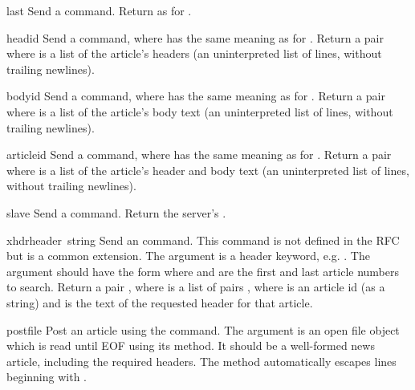 \begin{funcdesc}{last}{}
Send a  command.  Return as for .
\end{funcdesc}

\begin{funcdesc}{head}{id}
Send a  command, where  has the same meaning as for
.  Return a pair 
where  is a list of the article's headers (an uninterpreted
list of lines, without trailing newlines).
\end{funcdesc}

\begin{funcdesc}{body}{id}
Send a  command, where  has the same meaning as for
.  Return a pair 
where  is a list of the article's body text (an
uninterpreted list of lines, without trailing newlines).
\end{funcdesc}

\begin{funcdesc}{article}{id}
Send a  command, where  has the same meaning as
for .  Return a pair 
where  is a list of the article's header and body text (an
uninterpreted list of lines, without trailing newlines).
\end{funcdesc}

\begin{funcdesc}{slave}{}
Send a  command.  Return the server's .
\end{funcdesc}

\begin{funcdesc}{xhdr}{header\, string}
Send an  command.  This command is not defined in the RFC
but is a common extension.  The  argument is a header
keyword, e.g. .  The  argument should have
the form  where  and
 are the first and last article numbers to search.  Return a
pair , where  is a list of
pairs , where  is an article id
(as a string) and  is the text of the requested header for
that article.
\end{funcdesc}

\begin{funcdesc}{post}{file}
Post an article using the  command.  The 
argument is an open file object which is read until EOF using its
 method.  It should be a well-formed news article,
including the required headers.  The  method
automatically escapes lines beginning with .
\end{funcdesc}

